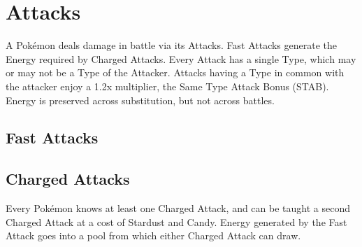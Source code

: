 \chapter{Attacks}
A Pokémon deals damage in battle via its Attacks. Fast Attacks generate the
Energy required by Charged Attacks. Every Attack has a single Type, which
may or may not be a Type of the Attacker. Attacks having a Type in common
with the attacker enjoy a 1.2x multiplier, the Same Type Attack Bonus (STAB).
Energy is preserved across substitution, but not across battles.

\section{Fast Attacks}

\section{Charged Attacks}
Every Pokémon knows at least one Charged Attack, and can be taught a second
Charged Attack at a cost of Stardust and Candy. Energy generated by the Fast
Attack goes into a pool from which either Charged Attack can draw.

